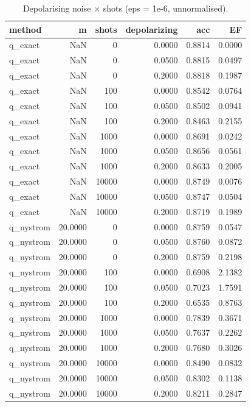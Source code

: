 \begin{table}
\caption{Depolarising noise × shots (eps = 1e-6, unnormalised).}
\label{tab:table5_noise_depolarizing}
\begin{tabular}{lrrrrr}
\toprule
method & m & shots & depolarizing & acc & EF \\
\midrule
q\_exact & NaN & 0 & 0.0000 & 0.8814 & 0.0000 \\
q\_exact & NaN & 0 & 0.0500 & 0.8815 & 0.0497 \\
q\_exact & NaN & 0 & 0.2000 & 0.8818 & 0.1987 \\
q\_exact & NaN & 100 & 0.0000 & 0.8542 & 0.0764 \\
q\_exact & NaN & 100 & 0.0500 & 0.8502 & 0.0941 \\
q\_exact & NaN & 100 & 0.2000 & 0.8463 & 0.2155 \\
q\_exact & NaN & 1000 & 0.0000 & 0.8691 & 0.0242 \\
q\_exact & NaN & 1000 & 0.0500 & 0.8656 & 0.0561 \\
q\_exact & NaN & 1000 & 0.2000 & 0.8633 & 0.2005 \\
q\_exact & NaN & 10000 & 0.0000 & 0.8749 & 0.0076 \\
q\_exact & NaN & 10000 & 0.0500 & 0.8747 & 0.0504 \\
q\_exact & NaN & 10000 & 0.2000 & 0.8719 & 0.1989 \\
q\_nystrom & 20.0000 & 0 & 0.0000 & 0.8759 & 0.0547 \\
q\_nystrom & 20.0000 & 0 & 0.0500 & 0.8760 & 0.0872 \\
q\_nystrom & 20.0000 & 0 & 0.2000 & 0.8759 & 0.2198 \\
q\_nystrom & 20.0000 & 100 & 0.0000 & 0.6908 & 2.1382 \\
q\_nystrom & 20.0000 & 100 & 0.0500 & 0.7023 & 1.7591 \\
q\_nystrom & 20.0000 & 100 & 0.2000 & 0.6535 & 0.8763 \\
q\_nystrom & 20.0000 & 1000 & 0.0000 & 0.7839 & 0.3671 \\
q\_nystrom & 20.0000 & 1000 & 0.0500 & 0.7637 & 0.2262 \\
q\_nystrom & 20.0000 & 1000 & 0.2000 & 0.7680 & 0.3026 \\
q\_nystrom & 20.0000 & 10000 & 0.0000 & 0.8490 & 0.0832 \\
q\_nystrom & 20.0000 & 10000 & 0.0500 & 0.8302 & 0.1138 \\
q\_nystrom & 20.0000 & 10000 & 0.2000 & 0.8211 & 0.2847 \\

\end{tabular}
\end{table}
